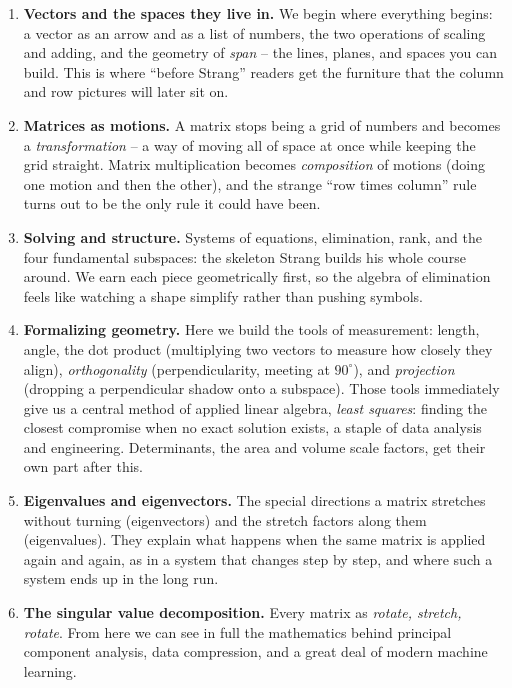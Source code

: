 \begin{enumerate}
\item \textbf{Vectors and the spaces they live in.} We begin where everything
begins: a vector as an arrow and as a list of numbers, the two operations of
scaling and adding, and the geometry of \emph{span} -- the lines, planes, and
spaces you can build. This is where ``before Strang'' readers get the furniture
that the column and row pictures will later sit on.

\item \textbf{Matrices as motions.} A matrix stops being a grid of numbers and
becomes a \emph{transformation} -- a way of moving all of space at once while
keeping the grid straight. Matrix multiplication becomes \emph{composition} of
motions (doing one motion and then the other), and the strange ``row times column''
rule turns out to be the only rule it could have been.

\item \textbf{Solving and structure.} Systems of equations, elimination, rank,
and the four fundamental subspaces: the skeleton Strang builds his whole course
around. We earn each piece geometrically first, so the algebra of elimination
feels like watching a shape simplify rather than pushing symbols.

\item \textbf{Formalizing geometry.} Here we build the tools of measurement: length,
angle, the dot product (multiplying two vectors to measure how closely they align),
\emph{orthogonality} (perpendicularity, meeting at $90^\circ$), and \emph{projection}
(dropping a perpendicular shadow onto a subspace). Those tools immediately give us a
central method of applied linear algebra, \emph{least squares}: finding the closest
compromise when no exact solution exists, a staple of data analysis and engineering.
Determinants, the area and volume scale factors, get their own part after this.

\item \textbf{Eigenvalues and eigenvectors.} The special directions a
matrix stretches without turning (eigenvectors) and the stretch factors along
them (eigenvalues). They explain what happens when the same matrix is applied
again and again, as in a system that changes step by step, and where such a
system ends up in the long run.

\item \textbf{The singular value decomposition.} Every matrix as
\emph{rotate, stretch, rotate}. From here we can see in full
the mathematics behind principal component analysis, data compression, and a great
deal of modern machine learning.
\end{enumerate}


